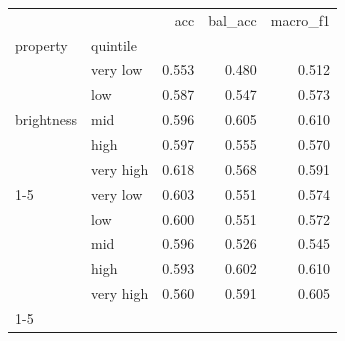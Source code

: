 \begin{tabular}{llrrr}
\toprule
 &  & acc & bal_acc & macro_f1 \\
property & quintile &  &  &  \\
\midrule
\multirow[t]{5}{*}{brightness} & very low & 0.553 & 0.480 & 0.512 \\
 & low & 0.587 & 0.547 & 0.573 \\
 & mid & 0.596 & 0.605 & 0.610 \\
 & high & 0.597 & 0.555 & 0.570 \\
 & very high & 0.618 & 0.568 & 0.591 \\
\cline{1-5}
\multirow[t]{5}{*}{contrast} & very low & 0.603 & 0.551 & 0.574 \\
 & low & 0.600 & 0.551 & 0.572 \\
 & mid & 0.596 & 0.526 & 0.545 \\
 & high & 0.593 & 0.602 & 0.610 \\
 & very high & 0.560 & 0.591 & 0.605 \\
\cline{1-5}
\bottomrule
\end{tabular}
